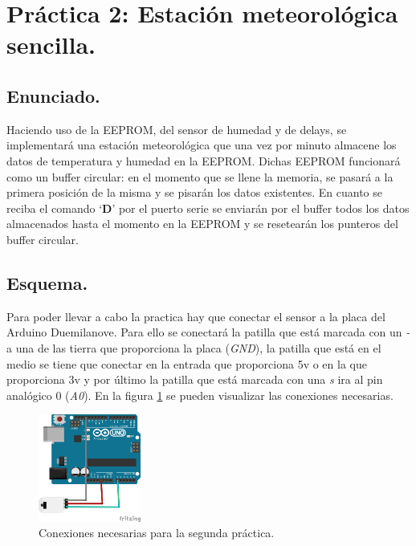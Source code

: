\documentclass{article}
\begin{document}
\section{Práctica 2: Estación meteorológica sencilla.}

\subsection{Enunciado.}

	Haciendo uso de la EEPROM, del sensor de humedad y de delays, se implementará una estación meteorológica que una vez por minuto almacene los datos de temperatura y humedad en la EEPROM. Dichas EEPROM funcionará como un buffer circular: en el momento que se llene la memoria, se pasará a la primera posición de la misma y se pisarán los datos existentes. En cuanto se reciba el comando `\textbf{D}' por el puerto serie se enviarán por el buffer todos los datos almacenados hasta el momento en la EEPROM y se resetearán los punteros del buffer circular.
	
\subsection{Esquema.}

	Para poder llevar a cabo la practica hay que conectar el sensor a la placa del Arduino Duemilanove. Para ello se conectará la patilla que está marcada con un \textit{-} a una de las tierra que proporciona la placa (\emph{GND}), la patilla que está en el medio se tiene que conectar en la entrada que proporciona 5v o en la que proporciona 3v y por último la patilla que está marcada con una \textit{s} ira al pin analógico 0 (\emph{A0}). En la figura \ref{fig:p2:schema} se pueden visualizar las conexiones necesarias.

\begin{figure}[h]
  \centering
    \includegraphics[width=0.3\textwidth]{img/p2_schema.png}
  \caption{Conexiones necesarias para la segunda práctica.}
  \label{fig:p2:schema}
\end{figure}
\end{document}
